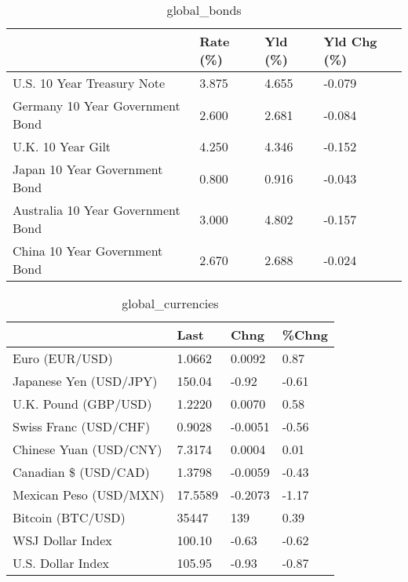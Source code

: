 \documentclass{article}%
\begin{document}
%


\begin{table}[htbp]%
\caption{global\_bonds}%
\centering%
\begin{adjustbox}{width=1\textwidth}%
\begin{tabular}{llll}
\toprule
                                  & Rate (\%) & Yld (\%) & Yld Chg (\%) \\
\midrule
       U.S. 10 Year Treasury Note &    3.875 &   4.655 &      -0.079 \\
  Germany 10 Year Government Bond &    2.600 &   2.681 &      -0.084 \\
                U.K. 10 Year Gilt &    4.250 &   4.346 &      -0.152 \\
    Japan 10 Year Government Bond &    0.800 &   0.916 &      -0.043 \\
Australia 10 Year Government Bond &    3.000 &   4.802 &      -0.157 \\
    China 10 Year Government Bond &    2.670 &   2.688 &      -0.024 \\
\bottomrule
\end{tabular}
%
\end{adjustbox}%
\end{table}

%


\begin{table}[htbp]%
\caption{global\_currencies}%
\centering%
\begin{adjustbox}{width=1\textwidth}%
\begin{tabular}{llll}
\toprule
                       &    Last &    Chng & \%Chng \\
\midrule
        Euro (EUR/USD) &  1.0662 &  0.0092 &  0.87 \\
Japanese Yen (USD/JPY) &  150.04 &   -0.92 & -0.61 \\
  U.K. Pound (GBP/USD) &  1.2220 &  0.0070 &  0.58 \\
 Swiss Franc (USD/CHF) &  0.9028 & -0.0051 & -0.56 \\
Chinese Yuan (USD/CNY) &  7.3174 &  0.0004 &  0.01 \\
  Canadian \$ (USD/CAD) &  1.3798 & -0.0059 & -0.43 \\
Mexican Peso (USD/MXN) & 17.5589 & -0.2073 & -1.17 \\
     Bitcoin (BTC/USD) &   35447 &     139 &  0.39 \\
      WSJ Dollar Index &  100.10 &   -0.63 & -0.62 \\
     U.S. Dollar Index &  105.95 &   -0.93 & -0.87 \\
\bottomrule
\end{tabular}
%
\end{adjustbox}%
\end{table}
\end{document}
